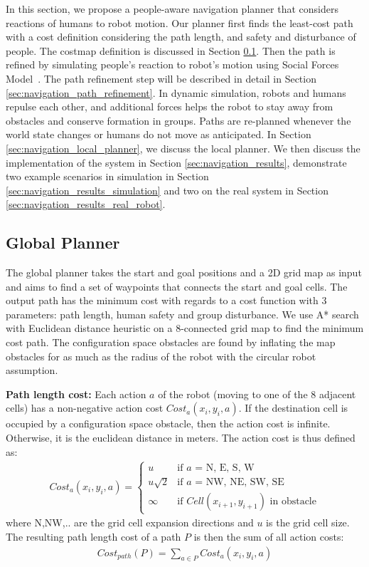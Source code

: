 In this section, we propose a people-aware navigation planner that considers reactions of humans to robot motion. Our planner first finds the least-cost path with a cost definition considering the path length, and safety and disturbance of people. The costmap definition is discussed in Section \ref{sec:navigation_global_planner}. Then the path is refined by simulating people's reaction to robot's motion using Social Forces Model~\cite{helbing1995social}. The path refinement step will be described in detail in Section \ref{sec:navigation_path_refinement}. In dynamic simulation, robots and humans repulse each other, and additional forces helps the robot to stay away from obstacles and conserve formation in groups. Paths are re-planned whenever the world state changes or humans do not move as anticipated. In Section \ref{sec:navigation_local_planner}, we discuss the local planner. We then discuss the implementation of the system in Section \ref{sec:navigation_results}, demonstrate two example scenarios in simulation in Section \ref{sec:navigation_results_simulation} and two on the real system in Section \ref{sec:navigation_results_real_robot}.


\subsection{Global Planner}
\label{sec:navigation_global_planner}

The global planner takes the start and goal positions and a 2D grid map as input and aims to find a set of waypoints that connects the start and goal cells. The output path has the minimum cost with regards to a cost function with 3 parameters: path length, human safety and group disturbance. We use A* search with Euclidean distance heuristic on a 8-connected grid map to find the minimum cost path. The configuration space obstacles are found by inflating the map obstacles for as much as the radius of the robot with the circular robot assumption.

\textbf{Path length cost:}  Each action $a$ of the robot (moving to one of the 8 adjacent cells) has a non-negative action cost $Cost_{a}(x_{i},y_{i},a)$. If the destination cell is occupied by a configuration space obstacle, then the action cost is infinite. Otherwise, it is the euclidean distance in meters. The action cost is thus defined as:
\begin{align}
Cost_{a}(x_{i},y_{i},a)=\left\{ \begin{array}{cl}
u & \textrm{if $a$ = N, E, S, W}\\
u\sqrt{2} & \textrm{if $a$ = NW, NE, SW, SE}\\
\infty & \textrm{if  $Cell(x_{i+1}, y_{i+1})$ in obstacle} \end{array}\right.
\end{align}
where N,NW,.. are the grid cell expansion directions and $u$ is the grid cell size. The resulting path length cost of a path $P$ is then the sum of all action costs: 
\begin{align}
Cost_{path}(P) = \sum\limits_{a \in P} Cost_{a}(x_{i},y_{i},a)
\end{align}

